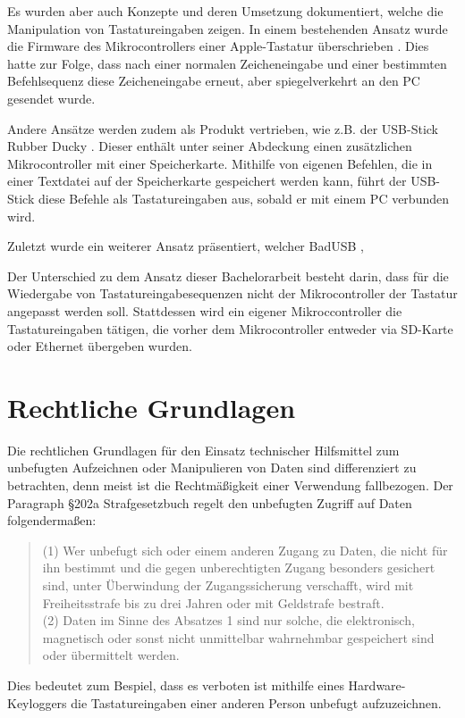 Es wurden aber auch Konzepte und deren Umsetzung dokumentiert, welche die Manipulation von Tastatureingaben zeigen. In einem bestehenden Ansatz wurde die Firmware des Mikrocontrollers einer Apple-Tastatur überschrieben \cite{chen}. Dies hatte zur Folge, dass nach einer normalen Zeicheneingabe und einer bestimmten Befehlsequenz diese Zeicheneingabe erneut, aber spiegelverkehrt an den PC gesendet wurde.

Andere Ansätze werden zudem als Produkt vertrieben, wie z.B. der USB-Stick Rubber Ducky \cite{ducky}. Dieser enthält unter seiner Abdeckung einen zusätzlichen Mikrocontroller mit einer Speicherkarte. Mithilfe von eigenen Befehlen, die in einer Textdatei auf der Speicherkarte gespeichert werden kann, führt der USB-Stick diese Befehle als Tastatureingaben aus, sobald er mit einem PC verbunden wird.

Zuletzt wurde ein weiterer Ansatz präsentiert, welcher BadUSB \cite{badusb},

Der Unterschied zu dem Ansatz dieser Bachelorarbeit besteht darin, dass für die Wiedergabe von Tastatureingabesequenzen nicht der Mikrocontroller der Tastatur angepasst werden soll. Stattdessen wird ein eigener Mikroccontroller die Tastatureingaben tätigen, die vorher dem Mikrocontroller entweder via SD-Karte oder Ethernet übergeben wurden.



\section{Rechtliche Grundlagen}
Die rechtlichen Grundlagen für den Einsatz technischer Hilfsmittel zum unbefugten Aufzeichnen oder Manipulieren von Daten sind differenziert zu betrachten, denn meist ist die Rechtmäßigkeit einer Verwendung fallbezogen. Der Paragraph \S 202a Strafgesetzbuch \cite{stgb} regelt den unbefugten Zugriff auf Daten folgendermaßen:
\begin{quote}
  (1) Wer unbefugt sich oder einem anderen Zugang zu Daten, die nicht für ihn bestimmt und die gegen unberechtigten Zugang besonders gesichert sind, unter Überwindung der Zugangssicherung verschafft, wird mit Freiheitsstrafe bis zu drei Jahren oder mit Geldstrafe bestraft. \\
  (2) Daten im Sinne des Absatzes 1 sind nur solche, die elektronisch, magnetisch oder sonst nicht unmittelbar wahrnehmbar gespeichert sind oder übermittelt werden.
\end{quote}
Dies bedeutet zum Bespiel, dass es verboten ist mithilfe eines Hardware-Keyloggers die Tastatureingaben einer anderen Person unbefugt aufzuzeichnen.

